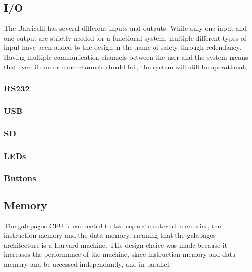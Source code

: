 \subsection{I/O}

The Barricelli has several different inputs and outputs.
While only one input and one output are strictly needed for a functional system, multiple different types of input have been added to the design in the name of safety through redendancy.
Having multiple communication channels between the user and the system means that even if one or more channels should fail, the system will still be operational.

\subsubsection{RS232}


\subsubsection{USB}


\subsubsection{SD}


\subsubsection{LEDs}


\subsubsection{Buttons}


\subsection{Memory}

The \Gls{galapagos} CPU is connected to two separate external memories, the instruction memory and the data memory, meaning that the \Gls{galapagos} architecture is a Harvard machine.
This design choice was made because it increases the performance of the machine, since instruction memory and data memory and be accessed independantly, and in parallel. 

